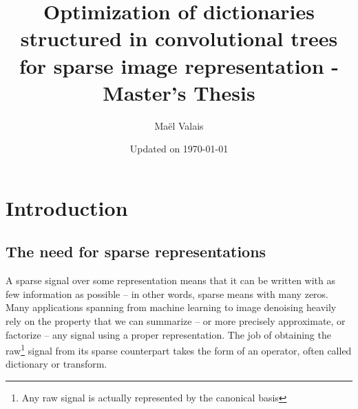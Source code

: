 


\author{Maël Valais}
\date{Updated on \today}
\title{Optimization of dictionaries structured in convolutional trees for sparse image representation - Master's Thesis}

\tableofcontents

\chapter{Introduction}

\section{The need for sparse representations}

A sparse signal over some representation means that it can be written with as few information as possible – in other words, sparse means with many zeros. Many applications spanning from machine learning to image denoising heavily rely on the property that we can summarize – or more precisely approximate, or factorize – any signal using a proper representation. The job of obtaining the raw\footnote{Any raw signal is actually represented by the canonical basis} signal from its sparse counterpart takes the form of an operator, often called dictionary or transform.

